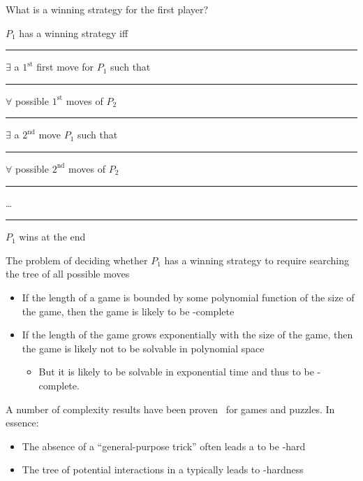 \documentclass[a4paper]{report}
\theoremstyle{definition}
\begin{document}
What is a winning strategy for the first player?

$P_1$ has a winning strategy iff\\
\textcolor{white}{\rule{0.5cm}{0.4pt}} $\exists$ a $1^{\text{st}}$ first move for $P_1$ such that\\
\textcolor{white}{\rule{1.0cm}{0.4pt}} $\forall$ possible $1^{\text{st}}$ moves of $P_2$\\
\textcolor{white}{\rule{1.5cm}{0.4pt}} $\exists$ a $2^{\text{nd}}$ move $P_1$ such that \\
\textcolor{white}{\rule{2.0cm}{0.4pt}} $\forall$ possible $2^{\text{nd}}$ moves of $P_2$\\
\textcolor{white}{\rule{2.5cm}{0.4pt}} \dots{}\\
\textcolor{white}{\rule{3.0cm}{0.4pt}} $P_1$ wins at the end

The problem of deciding whether $P_1$ has a winning strategy  to require searching the tree of all possible moves
\begin{itemize}
\item If the length of a game is bounded by some polynomial function of the size of the game, then the game is likely to be \PSPACE-complete
\item If the length of the game grows exponentially with the size of the game, then the game is likely not to be solvable in polynomial space
\begin{itemize}
\item But it is likely to be solvable in exponential time and thus to be \EXP-complete.
\end{itemize}
\end{itemize}

A number of complexity results have been proven~\citep{eppstein-survey-web} %
for games and puzzles. In essence:
\begin{itemize}
\item The absence of a ``general-purpose trick'' often leads a  to be \NP-hard
\item The tree of potential interactions in a  typically leads to \PSPACE-hardness
\end{itemize}

 
\end{document}
